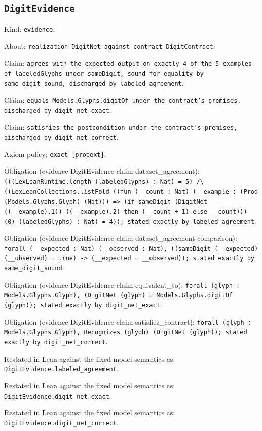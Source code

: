 \documentclass[11pt]{article}
\begin{document}
\subsection*{\texttt{DigitEvidence}}
\noindent Kind: \texttt{evidence}.\par
\noindent About: \texttt{realization DigitNet against contract DigitContract}.\par
\noindent Claim: \texttt{agrees with the expected output on exactly 4 of the 5 examples of labeledGlyphs under sameDigit, sound for equality by same\_digit\_sound, discharged by labeled\_agreement}.\par
\noindent Claim: \texttt{equals Models.Glyphs.digitOf under the contract's premises, discharged by digit\_net\_exact}.\par
\noindent Claim: \texttt{satisfies the postcondition under the contract's premises, discharged by digit\_net\_correct}.\par
\noindent Axiom policy: \texttt{exact [propext]}.\par
\noindent Obligation (evidence DigitEvidence claim dataset\_agreement): \texttt{(((LexLeanRuntime.length (labeledGlyphs) : Nat) = 5) /\textbackslash{} ((LexLeanCollections.listFold ((fun (\_\_count : Nat) (\_\_example : (Prod (Models.Glyphs.Glyph) (Nat))) => (if sameDigit (DigitNet ((\_\_example).1)) ((\_\_example).2) then (\_\_count + 1) else \_\_count))) (0) (labeledGlyphs) : Nat) = 4)); stated exactly by labeled\_agreement}.\par
\noindent Obligation (evidence DigitEvidence claim dataset\_agreement comparison): \texttt{forall (\_\_expected : Nat) (\_\_observed : Nat), ((sameDigit (\_\_expected) (\_\_observed) = true) -> (\_\_expected = \_\_observed)); stated exactly by same\_digit\_sound}.\par
\noindent Obligation (evidence DigitEvidence claim equivalent\_to): \texttt{forall (glyph : Models.Glyphs.Glyph), (DigitNet (glyph) = Models.Glyphs.digitOf (glyph)); stated exactly by digit\_net\_exact}.\par
\noindent Obligation (evidence DigitEvidence claim satisfies\_contract): \texttt{forall (glyph : Models.Glyphs.Glyph), Recognizes (glyph) (DigitNet (glyph)); stated exactly by digit\_net\_correct}.\par
\noindent Restated in Lean against the fixed model semantics as: \texttt{DigitEvidence.labeled\_agreement}.\par
\noindent Restated in Lean against the fixed model semantics as: \texttt{DigitEvidence.digit\_net\_exact}.\par
\noindent Restated in Lean against the fixed model semantics as: \texttt{DigitEvidence.digit\_net\_correct}.\par
\end{document}
